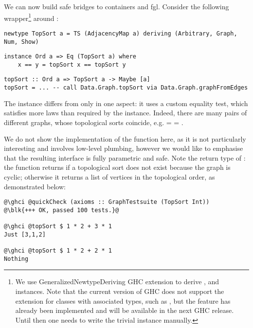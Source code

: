 We can now build safe bridges to \textsf{containers} and \textsf{fgl}. Consider
the following wrapper\footnote{We use \textsf{GeneralizedNewtypeDeriving} GHC
extension to derive ,  and  instances. Note that
the current version of GHC does not support the extension for classes
with associated types, such as , but the feature has already been
implemented and will be available in the next GHC release. Until then
one needs to write the trivial  instance manually.}
around :

\begin{verbatim}
newtype TopSort a = TS (AdjacencyMap a) deriving (Arbitrary, Graph, Num, Show)
\end{verbatim}
\vspace{1mm}
\begin{verbatim}
instance Ord a => Eq (TopSort a) where
    x == y = topSort x == topSort y
\end{verbatim}
\vspace{1mm}
\begin{verbatim}
topSort :: Ord a => TopSort a -> Maybe [a]
topSort = ... -- call Data.Graph.topSort via Data.Graph.graphFromEdges
\end{verbatim}

\noindent
The  instance differs from  only in one aspect: it uses
a custom equality test, which satisfies more laws than required by the 
instance. Indeed, there are many pairs of different graphs, whose topological sorts
coincide, e.g.  =  = .

We do not show the implementation of the  function here, as it is not
particularly interesting and involves low-level plumbing, however we would like to
emphasise that the resulting interface is fully parametric and safe. Note the
return type of : the function returns 
if a topological sort does not exist because the graph is cyclic; otherwise it
returns a list of vertices in the topological order, as demonstrated below:

\begin{verbatim}
@\ghci @quickCheck (axioms :: GraphTestsuite (TopSort Int))
@\blk{+++ OK, passed 100 tests.}@

@\ghci @topSort $ 1 * 2 + 3 * 1
Just [3,1,2]

@\ghci @topSort $ 1 * 2 + 2 * 1
Nothing
\end{verbatim}

